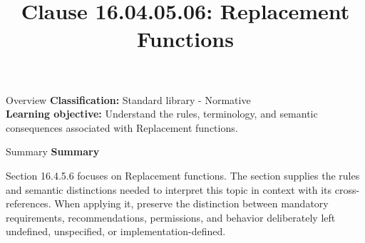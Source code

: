 \documentclass[10pt,letterpaper]{article}
\title{Clause 16.04.05.06: Replacement Functions}
\author{}
\date{}
\begin{document}
\maketitle
\begin{CornellOverviewBox}{Overview}
\textbf{Classification:} Standard library - Normative\\[2pt]
\textbf{Learning objective:} Understand the rules, terminology, and semantic consequences associated with Replacement functions.
\end{CornellOverviewBox}\begin{CornellSummaryBox}{Summary}
{\sffamily\bfseries\color{Accent} Summary}\par\vspace{3pt}Section 16.4.5.6 focuses on Replacement functions. The section supplies the rules and semantic distinctions needed to interpret this topic in context with its cross-references. When applying it, preserve the distinction between mandatory requirements, recommendations, permissions, and behavior deliberately left undefined, unspecified, or implementation-defined.
\end{CornellSummaryBox}
\end{document}
